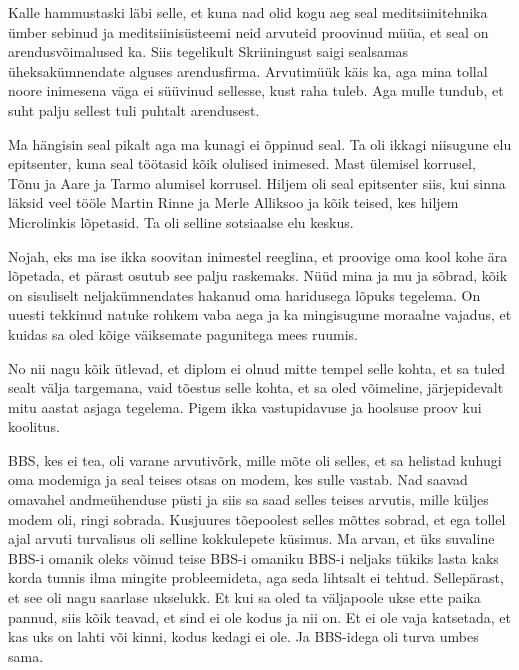 Kalle hammustaski läbi selle, et kuna nad olid kogu 
aeg seal meditsiinitehnika ümber sebinud ja meditsiinisüsteemi neid arvuteid 
proovinud müüa, et seal on arendusvõimalused 
ka. Siis tegelikult Skriiningust saigi sealsamas 
üheksakümnendate alguses  arendusfirma. Arvutimüük käis ka, aga mina  
tollal noore inimesena väga ei süüvinud sellesse, kust raha tuleb. Aga mulle 
tundub, et suht palju sellest tuli puhtalt arendusest.



Ma hängisin seal pikalt aga ma kunagi ei õppinud seal. Ta oli ikkagi niisugune 
elu epitsenter, kuna seal töötasid kõik olulised inimesed. 
Mast ülemisel korrusel, Tõnu 
ja 
Aare ja Tarmo alumisel 
korrusel. Hiljem oli seal epitsenter siis, kui sinna läksid veel tööle 
Martin Rinne ja Merle Alliksoo ja kõik teised, kes hiljem Microlinkis lõpetasid. Ta 
oli selline  sotsiaalse elu keskus. 


Nojah, eks ma ise ikka soovitan inimestel reeglina, et  proovige oma kool kohe 
ära lõpetada, et pärast osutub see palju raskemaks. Nüüd mina ja mu ja sõbrad, 
kõik on sisuliselt neljakümnendates hakanud oma haridusega lõpuks tegelema. On 
uuesti tekkinud natuke rohkem vaba aega ja ka mingisugune moraalne vajadus, et 
kuidas sa oled kõige väiksemate pagunitega mees ruumis.


No nii nagu kõik ütlevad, et diplom ei olnud mitte tempel selle 
kohta, et sa tuled sealt välja targemana, vaid tõestus selle kohta, et sa 
oled võimeline, järjepidevalt mitu aastat asjaga tegelema. Pigem ikka 
vastupidavuse ja hoolsuse proov kui koolitus.


BBS, kes ei tea, oli varane  arvutivõrk, mille mõte oli selles, et sa helistad 
kuhugi oma modemiga ja seal teises otsas on modem, kes sulle vastab. Nad saavad 
omavahel andmeühenduse püsti ja siis sa saad selles teises arvutis, mille 
küljes modem oli, ringi sobrada. Kusjuures tõepoolest selles mõttes 
sobrad, et ega tollel ajal arvuti turvalisus oli selline kokkulepete 
küsimus. Ma arvan, et  üks suvaline BBS-i omanik oleks võinud teise 
BBS-i omaniku BBS-i neljaks tükiks  lasta kaks korda tunnis ilma mingite 
probleemideta, aga seda lihtsalt ei tehtud. Sellepärast, et see oli nagu 
saarlase ukselukk. Et kui sa oled ta väljapoole ukse ette paika pannud, siis 
kõik 
teavad, et sind ei ole kodus ja nii on. Et ei ole vaja katsetada, et kas uks 
on lahti või kinni, kodus kedagi ei ole. Ja BBS-idega oli  turva umbes sama. 

